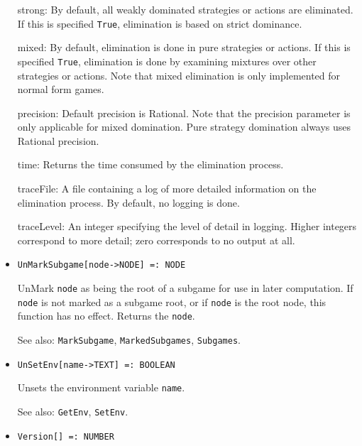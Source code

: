 \begin{itemize}
\bd
\item [strong:] By default, all weakly dominated strategies or actions
are eliminated.  If this is specified \verb+True+, elimination is based
on strict dominance.
\item [mixed:] By default, elimination is done in pure strategies or
actions.  If this is specified \verb+True+, elimination is done by
examining mixtures over other strategies or actions.  Note that mixed 
elimination is only implemented for normal form games.  
\item [precision:] Default precision is Rational.  Note that the precision
parameter is only applicable for mixed domination.  Pure strategy
domination always uses Rational precision.
\item [time:] Returns the time consumed by the elimination process.
\item [traceFile:] A file containing a log of more detailed information
on the elimination process.  By default, no logging is done.
\item [traceLevel:] An integer specifying the level of detail in logging.
Higher integers correspond to more detail; zero corresponds to no output
at all.
\ed
\ed

\item{}
\protect \large \begin{verbatim}
UnMarkSubgame[node->NODE] =: NODE 
\end{verbatim}\normalsize

\bd
UnMark \verb+node+ as being the root of a subgame for use in later
computation.  If \verb+node+ is not marked as a subgame root, or if
\verb+node+ is the root node, this function has no effect.  Returns
the \verb+node+.
\item [See also:] \verb+MarkSubgame+, \verb+MarkedSubgames+,
\verb+Subgames+.
\ed


\item{}
\protect \large \begin{verbatim}
UnSetEnv[name->TEXT] =: BOOLEAN 
\end{verbatim} \normalsize

\bd
Unsets the environment variable \verb+name+.
\item [See also:] \verb+GetEnv+, \verb+SetEnv+.
\ed


\item{}
\protect \large \begin{verbatim}
Version[] =: NUMBER 
\end{verbatim} \normalsize


\end{itemize}
